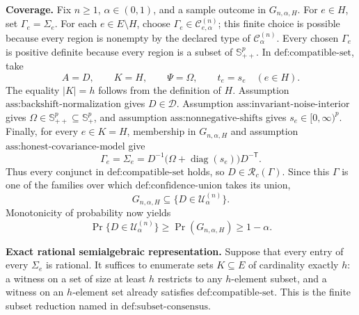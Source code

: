 \textbf{Coverage.}
Fix \(n\geq 1\), \(\alpha\in(0,1)\), and a sample outcome in \(G_{n,\alpha,H}\).  For \(e\in H\), set \(\Gamma_e=\Sigma_e\).  For each \(e\in E\setminus H\), choose \(\Gamma_e\in\mathcal C^{(n)}_{e,\alpha}\); this finite choice is possible because every region is nonempty by the declared type of \(\mathcal C^{(n)}_\alpha\).  Every chosen \(\Gamma_e\) is positive definite because every region is a subset of \(\mathbb S_{++}^p\).  In \(\text{def:compatible-set}\), take
\[
 A=D,\qquad K=H,\qquad \Psi=\Omega,\qquad t_e=s_e\quad(e\in H).
\]
The equality \(|K|=h\) follows from the definition of \(H\).  Assumption \(\text{ass:backshift-normalization}\) gives \(D\in\mathcal D\).  Assumption \(\text{ass:invariant-noise-interior}\) gives \(\Omega\in\mathbb S_{++}^p\subseteq\mathbb S_+^p\), and assumption \(\text{ass:nonnegative-shifts}\) gives \(s_e\in[0,\infty)^p\).  Finally, for every \(e\in K=H\), membership in \(G_{n,\alpha,H}\) and assumption \(\text{ass:honest-covariance-model}\) give
\[
 \Gamma_e=\Sigma_e
 =D^{-1}\bigl(\Omega+\operatorname{diag}(s_e)\bigr)D^{-\mathsf T}.
\]
Thus every conjunct in \(\text{def:compatible-set}\) holds, so \(D\in\mathcal R_c(\Gamma)\).  Since this \(\Gamma\) is one of the families over which \(\text{def:confidence-union}\) takes its union,
\[
 G_{n,\alpha,H}\subseteq\{D\in\mathcal U^{(n)}_\alpha\}.
\]
Monotonicity of probability now yields
\[
 \Pr\{D\in\mathcal U^{(n)}_\alpha\}
 \geq \Pr(G_{n,\alpha,H})\geq 1-\alpha.
\]

\textbf{Exact rational semialgebraic representation.}
Suppose that every entry of every \(\Sigma_e\) is rational.  It suffices to enumerate sets \(K\subseteq E\) of cardinality exactly \(h\): a witness on a set of size at least \(h\) restricts to any \(h\)-element subset, and a witness on an \(h\)-element set already satisfies \(\text{def:compatible-set}\).  This is the finite subset reduction named in \(\text{def:subset-consensus}\).

